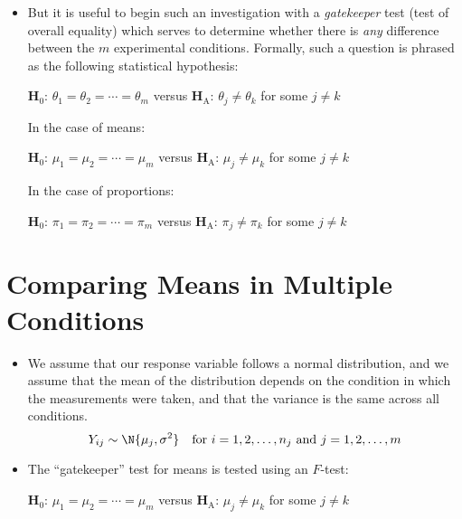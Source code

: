 \begin{itemize}
      \item But it is useful to begin such an investigation with a \emph{gatekeeper}
            test (test of overall equality) which serves to determine whether
            there is \emph{any} difference between the $ m $ experimental conditions.
            Formally, such a question is phrased as the following statistical hypothesis:
            \begin{tightcenter}
                  $ \mathbf{H}_0 $: $ \theta_1=\theta_2=\cdots=\theta_m $ versus $ \mathbf{H}_\text{A} $: $ \theta_j\ne \theta_k $ for some $ j\ne k $
            \end{tightcenter}
            In the case of means:
            \begin{tightcenter}
                  $ \mathbf{H}_0 $: $ \mu_1=\mu_2=\cdots=\mu_m $ versus $ \mathbf{H}_\text{A} $: $ \mu_j\ne \mu_k $ for some $ j\ne k $
            \end{tightcenter}
            In the case of proportions:
            \begin{tightcenter}
                  $ \mathbf{H}_0 $: $ \pi_1=\pi_2=\cdots=\pi_m $ versus $ \mathbf{H}_\text{A} $: $ \pi_j\ne \pi_k $ for some $ j\ne k $
            \end{tightcenter}
\end{itemize}
\section{Comparing Means in Multiple Conditions}
\begin{itemize}
      \item We assume that our response variable follows a normal distribution,
            and we assume that the mean of the distribution depends on the condition
            in which the measurements were taken, and that the variance
            is the same across all conditions.
            \[ Y_{ij}\sim \N{\mu_j,\sigma^2}\quad\text{for }i=1,2,\ldots,n_j\text{ and }j=1,2,\ldots,m \]
      \item The ``gatekeeper'' test for means is tested using an $ F $-test:
            \begin{tightcenter}
                  $ \mathbf{H}_0 $: $ \mu_1=\mu_2=\cdots=\mu_m $ versus $\mathbf{H}_\text{A}$: $ \mu_j\ne \mu_k $ for some $ j\ne k $
            \end{tightcenter}
\end{itemize}

